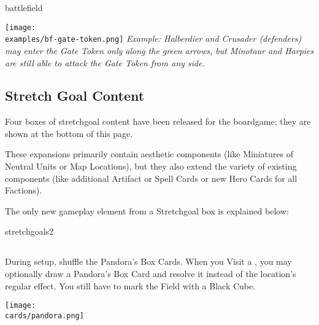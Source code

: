 \begin{expansion}{battlefield}
\begin{multicols*}{2}
\begin{itemize}
    \vspace*{1em}
    \texttt{[image: \\examples/bf-gate-token.png]}
    \footnotesize\textit{Example: Halberdier and Crusader (defenders) may enter the Gate Token only along the green arrows, but Minotaur and Harpies are still able to attack the Gate Token from any side.}
  \end{itemize}
    \vspace*{\fill}
  \end{multicols*}
\end{expansion}

\newpage
\begin{multicols}{2}

\subsection*{Stretch Goal Content}

Four boxes of stretchgoal content have been released for the boardgame; they are shown at the bottom of this page.\par
These expansions primarily contain aesthetic components (like Miniatures of Neutral Units or Map Locations), but they also extend the variety of existing components (like additional Artifact or Spell Cards or new Hero Cards for all Factions).\par
\smallskip

The only new gameplay element from a Stretchgoal box is explained below:\par
\vspace*{1em}
 \begin{expansion}{stretchgoals2}
   \subsection*{}
   During setup, shuffle the Pandora's Box Cards.
   When you Visit a , you may optionally draw a Pandora's Box Card and resolve it instead of the location's regular effect.
   You still have to mark the Field with a Black Cube.

   \medskip
   \begin{center}
     \texttt{[image: \\cards/pandora.png]}
   \end{center}
 \end{expansion}
 \vspace*{\fill}
 \columnbreak

\end{multicols}
